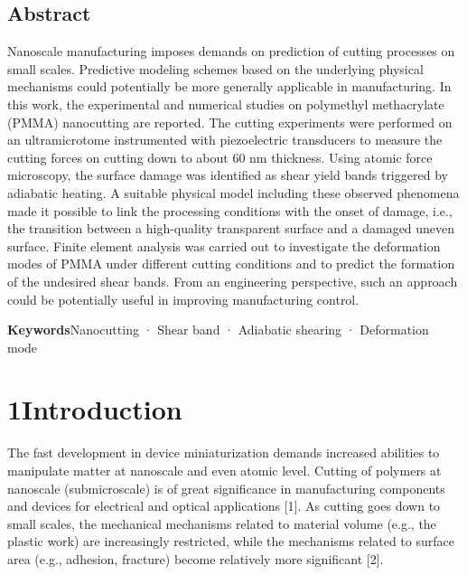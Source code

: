 \documentclass{article}
\begin{document}
\subsection*{Abstract}
Nanoscale manufacturing imposes demands on prediction of cutting processes on small scales. Predictive modeling schemes based on the underlying physical mechanisms could potentially be more generally applicable in manufacturing. In this work, the experimental and numerical studies on polymethyl methacrylate (PMMA) nanocutting are reported. The cutting experiments were performed on an ultramicrotome instrumented with piezoelectric transducers to measure the cutting forces on cutting down to about 60 nm thickness. Using atomic force microscopy, the surface damage was identified as shear yield bands triggered by adiabatic heating. A suitable physical model including these observed phenomena made it possible to link the processing conditions with the onset of damage, i.e., the transition between a high-quality transparent surface and a damaged uneven surface. Finite element analysis was carried out to investigate the deformation modes of PMMA under different cutting conditions and to predict the formation of the undesired shear bands. From an engineering perspective, such an approach could be potentially useful in improving manufacturing control.

\noindent\textbf{Keywords}\quad Nanocutting · Shear band · Adiabatic shearing · Deformation mode

\section*{1\quad Introduction}

The fast development in device miniaturization demands increased abilities to manipulate matter at nanoscale and even atomic level. Cutting of polymers at nanoscale (submicroscale) is of great significance in manufacturing components and devices for electrical and optical applications [1]. As cutting goes down to small scales, the mechanical mechanisms related to material volume (e.g., the plastic work) are increasingly restricted, while the mechanisms related to surface area (e.g., adhesion, fracture) become relatively more significant [2].
\end{document}
